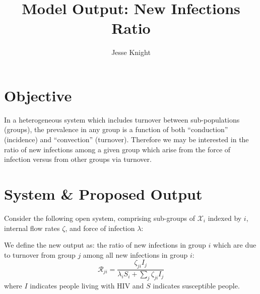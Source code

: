 \documentclass{article}
\title{Model Output: New Infections Ratio}
\author{Jesse Knight}
\begin{document}
\maketitle\vspace{-3em}
\section{Objective}
In a heterogeneous system which includes turnover between sub-populations (groups),
the prevalence in any group is a function of both
``conduction'' (incidence) and ``convection'' (turnover).
Therefore we may be interested in the ratio of new infections among a given group
which arise from the force of infection versus from other groups via turnover.
\section{System \& Proposed Output}
Consider the following open system, comprising sub-groups of $\mathcal{X}_i$ indexed by $i$,
internal flow rates $\zeta$, and force of infection $\lambda$:
\begin{figure}[h]
  \centering
\end{figure}
\par
We define the new output as: the ratio of new infections in group $i$
which are due to turnover from group $j$
among all new infections in group $i$:
\begin{equation}
\mathcal{R}_{ji} = \frac{\zeta_{ji} {I}_j}{\lambda_i {S}_i + \sum_j \zeta_{ji} {I}_j}
\end{equation}
where $I$ indicates people living with HIV and $S$ indicates susceptible people.
\end{document}

